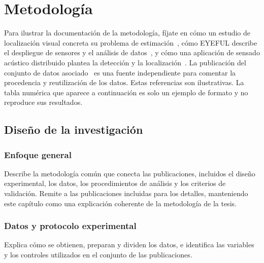 %

\chapter{Metodología}
\label{cha:compendium-methodology}

Para ilustrar la documentación de la metodología, fíjate en cómo un estudio de localización visual concreta su problema de estimación~\cite{Sanabria2026Landmark}, cómo EYEFUL describe el despliegue de sensores y el análisis de datos~\cite{nieva2023eyeful}, y cómo una aplicación de sensado acústico distribuido plantea la detección y la localización~\cite{ramirez2026jstars}. La publicación del conjunto de datos asociado~\cite{ramireztorres2026distributedacousticsensingdataset} es una fuente independiente para comentar la procedencia y reutilización de los datos. Estas referencias son ilustrativas. La tabla numérica que aparece a continuación es solo un ejemplo de formato y no reproduce sus resultados.

\section{Diseño de la investigación}
\subsection{Enfoque general}

Describe la metodología común que conecta las publicaciones, incluidos el diseño experimental, los datos, los procedimientos de análisis y los criterios de validación. Remite a las publicaciones incluidas para los detalles, manteniendo este capítulo como una explicación coherente de la metodología de la tesis.

\subsection{Datos y protocolo experimental}

Explica cómo se obtienen, preparan y dividen los datos, e identifica las variables y los controles utilizados en el conjunto de las publicaciones.

